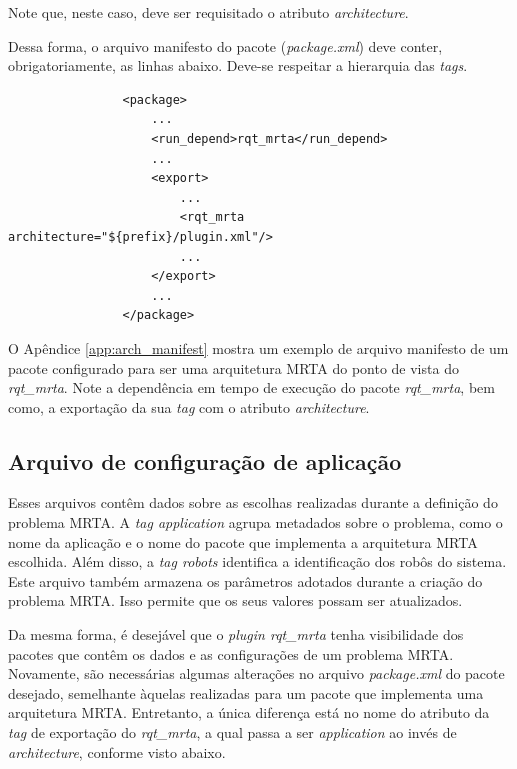             Note que, neste caso, deve ser requisitado o atributo \textit{architecture}.
            
            Dessa forma, o arquivo manifesto do pacote (\textit{package.xml}) deve conter, obrigatoriamente, as linhas abaixo. Deve-se respeitar a hierarquia das \textit{tags}.
            
            \begin{lstlisting}
                <package>
                    ...
                    <run_depend>rqt_mrta</run_depend>
                    ...
                    <export>
                        ...
                        <rqt_mrta architecture="${prefix}/plugin.xml"/>
                        ...
                    </export>
                    ...
                </package>
            \end{lstlisting}
            
            O Apêndice \ref{app:arch_manifest} mostra um exemplo de arquivo manifesto de um pacote configurado para ser uma arquitetura MRTA do ponto de vista do \textit{rqt\_mrta}. Note a dependência em tempo de execução do pacote \textit{rqt\_mrta}, bem como, a exportação da sua \textit{tag} com o atributo \textit{architecture}.
        
        \subsection{Arquivo de configuração de aplicação} \label{subsec:app_config}
            Esses arquivos contêm dados sobre as escolhas realizadas durante a definição do problema MRTA. A \textit{tag application} agrupa metadados sobre o problema, como o nome da aplicação e o nome do pacote que implementa a arquitetura MRTA escolhida. Além disso, a \textit{tag robots} identifica a identificação dos robôs do sistema. Este arquivo também armazena os parâmetros adotados durante a criação do problema MRTA. Isso permite que os seus valores possam ser atualizados.
        
            Da mesma forma, é desejável que o \textit{plugin rqt\_mrta} tenha visibilidade dos pacotes que contêm os dados e as configurações de um problema MRTA. Novamente, são necessárias algumas alterações no arquivo \textit{package.xml} do pacote desejado, semelhante àquelas realizadas para um pacote que implementa uma arquitetura MRTA. Entretanto, a única diferença está no nome do atributo da \textit{tag} de exportação do \textit{rqt\_mrta}, a qual passa a ser \textit{application} ao invés de \textit{architecture}, conforme visto abaixo.
            
